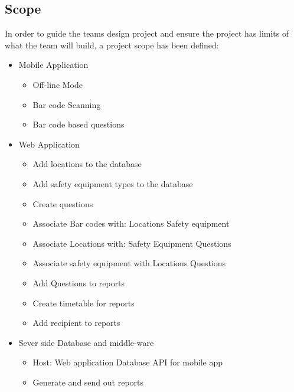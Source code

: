 \documentclass[Letter,11pt]{article}
\begin{document}
	\subsection{Scope}\label{scope}
	In order to guide the teams design project and ensure the project has limits of what the team will build, a project scope has been defined:
		\begin{itemize}
			\item Mobile Application
			\begin{itemize}
				\item Off-line Mode
				\item Bar code Scanning
				\item Bar code based questions
			\end{itemize}
			\item Web Application
			\begin{itemize}
				\item Add locations to the database
				\item Add safety equipment types to the database
				\item Create questions
				\item Associate Bar codes with:
				\subitem Locations
				\subitem Safety equipment
				\item Associate Locations with:
				\subitem Safety Equipment
				\subitem Questions
				\item Associate safety equipment with
				\subitem Locations
				\subitem Questions
				\item Add Questions to reports
				\item Create timetable for reports
				\item Add recipient to reports
			\end{itemize}
			\item Sever side Database and middle-ware
			\begin{itemize}
				\item Host:
				\subitem Web application
				\subitem Database API for mobile app
				\item Generate and send out reports
			\end{itemize}
		\end{itemize}
\end{document}
